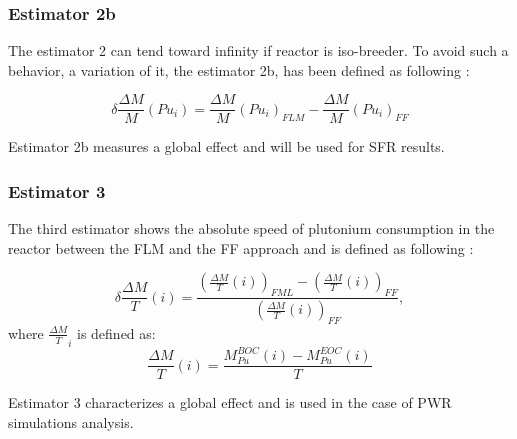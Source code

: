 \subsubsection{Estimator 2b}

The estimator 2 can tend toward infinity if reactor is iso-breeder. To avoid
such a behavior, a variation of it, the estimator 2b, has been defined as following : 

\begin{equation}
    \delta \frac{\Delta M}{M}(Pu_i) = \frac{\Delta M}{M}(Pu_i)_{FLM} - \frac{\Delta M}{M}(Pu_i)_{FF}
\end{equation}

Estimator 2b measures a global effect and will be used for \gls{SFR} results.

\subsubsection{Estimator 3}

The third estimator shows the absolute speed of plutonium consumption in the
reactor between the \gls{FLM} and the \gls{FF} approach and is defined as
following :

\begin{equation}
    \delta{\frac{\Delta M}{T}}(i) =
        \frac{\left(\frac{\Delta M}{T}(i)\right)_{FML}
              - \left(\frac{\Delta M}{T}(i)\right)_{FF}}
             {\left(\frac{\Delta M}{T}(i)\right)_{FF}},
\end{equation}
where $\frac{\Delta M}{T}_{i}$ is defined as:
\begin{equation}
    \frac{\Delta M}{T}(i) = \frac{M_{Pu}^{BOC}(i) -
    M_{Pu}^{EOC}(i)}{T}
\end{equation}

Estimator 3 characterizes a global effect and is used in the case of \gls{PWR}
simulations analysis.

